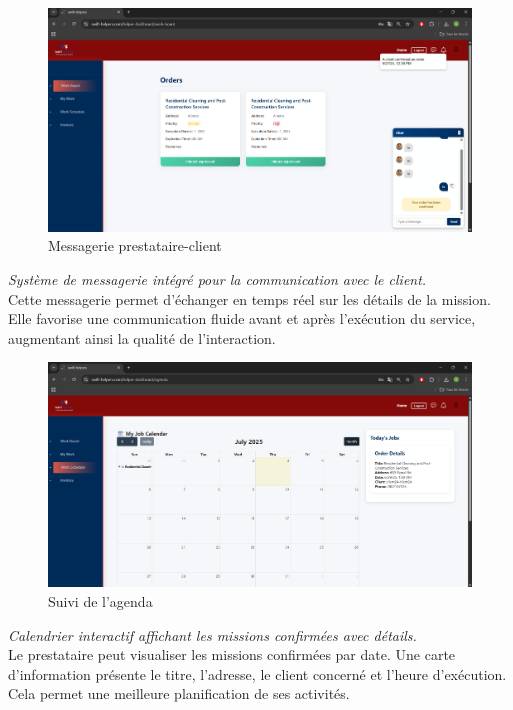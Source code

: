 \begin{figure}[H]
\centering
\includegraphics[width=0.85\linewidth]{figures/discussion.png}
\caption{Messagerie prestataire-client}
\end{figure}
\textit{Système de messagerie intégré pour la communication avec le client.}\\
Cette messagerie permet d’échanger en temps réel sur les détails de la mission. Elle favorise une communication fluide avant et après l’exécution du service, augmentant ainsi la qualité de l’interaction.

\begin{figure}[H]
\centering
\includegraphics[width=0.85\linewidth]{figures/schedules.png}
\caption{Suivi de l’agenda}
\end{figure}
\textit{Calendrier interactif affichant les missions confirmées avec détails.}\\
Le prestataire peut visualiser les missions confirmées par date. Une carte d'information présente le titre, l'adresse, le client concerné et l’heure d’exécution. Cela permet une meilleure planification de ses activités.


